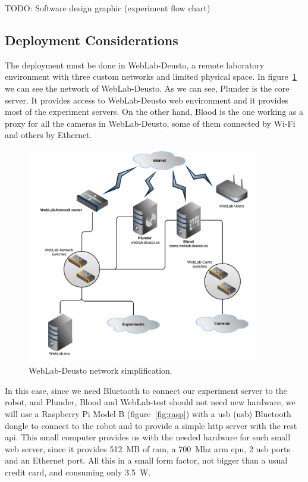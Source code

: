 TODO: Software design graphic (experiment flow chart)

\subsection{Deployment Considerations}

The deployment must be done in WebLab-Deusto, a remote laboratory environment with three custom
networks and limited physical space. In figure~\ref{fig:weblab-network} we can see the network of
WebLab-Deusto. As we can see, Plunder is the core server. It provides access to WebLab-Deusto web
environment and it provides most of the experiment servers. On the other hand, Blood is the one
working as a proxy for all the cameras in WebLab-Deusto, some of them connected by Wi-Fi and others
by Ethernet.

\begin{figure}[!htbp]
	\centering
	\includegraphics[width=0.9\textwidth]{fig/weblab-network}
	\caption{WebLab-Deusto network simplification.}\label{fig:weblab-network}
\end{figure}

In this case, since we need Bluetooth to connect our experiment server to the robot, and Plunder,
Blood and WebLab-test should not need new hardware, we will use a Raspberry Pi Model B
(figure~\ref{fig:rasp}) with a \acrshort{usb} (\acrlong{usb}) Bluetooth dongle to connect to the
robot and to provide a simple \acrshort{http} server with the \acrshort{rest} \acrshort{api}. This
small computer provides us with the needed hardware for such small web server, since it provides
512~MB of \acrshort{ram}, a 700~Mhz \acrshort{arm} \acrshort{cpu}, 2 \acrshort{usb} ports and an
Ethernet port. All this in a small form factor, not bigger than a usual credit card, and consuming
only 3.5~W.

